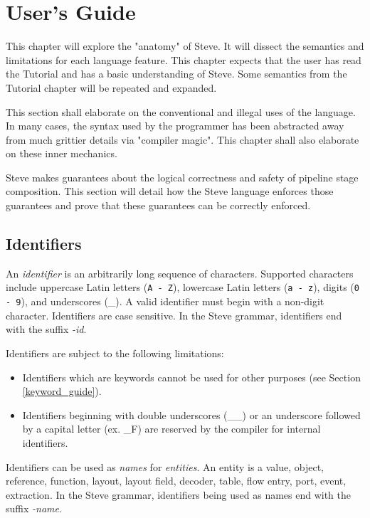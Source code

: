 \chapter{User's Guide} \label{users_guide}

This chapter will explore the "anatomy" of Steve. It will dissect the semantics and limitations for each language feature. This chapter expects that the user has read the Tutorial and has a basic understanding of Steve. Some semantics from the Tutorial chapter will be repeated and expanded. 

This section shall elaborate on the conventional and illegal uses of the language. In many cases, the syntax used by the programmer has been abstracted away from much grittier details via "compiler magic". This chapter shall also elaborate on these inner mechanics.

Steve makes guarantees about the logical correctness and safety of pipeline stage composition. This section will detail how the Steve language enforces those guarantees and prove that these guarantees can be correctly enforced.

\section{Identifiers} \label{identifiers_guide}

An \textit{identifier} is an arbitrarily long sequence of characters. Supported characters include uppercase Latin letters (\texttt{A - Z}), lowercase Latin letters (\texttt{a - z}), digits (\texttt{0 - 9}), and underscores (\_). A valid identifier must begin with a non-digit character. Identifiers are case sensitive. In the Steve grammar, identifiers end with the suffix \textit{-id}.

Identifiers are subject to the following limitations:

\begin{itemize}
\item Identifiers which are keywords cannot be used for other purposes (see Section \ref{keyword_guide}).

\item Identifiers beginning with double underscores (\_\_) or an underscore followed by a capital letter (ex. \_F) are reserved by the compiler for internal identifiers.
\end{itemize}

Identifiers can be used as \textit{names} for \textit{entities}. An entity is a value, object, reference, function, layout, layout field, decoder, table, flow entry, port, event, extraction. In the Steve grammar, identifiers being used as names end with the suffix \textit{-name}.

